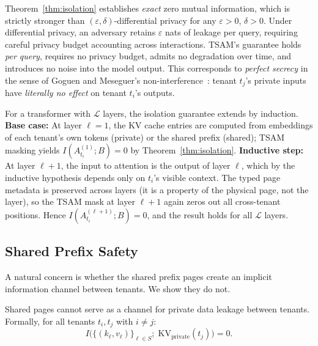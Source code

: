 \begin{remark}
\label{rem:dp-comparison}
Theorem~\ref{thm:isolation} establishes \emph{exact} zero mutual information, which is
strictly stronger than $(\varepsilon, \delta)$-differential privacy for any
$\varepsilon > 0$, $\delta > 0$. Under differential privacy, an adversary retains
$\varepsilon$ nats of leakage per query, requiring careful privacy budget accounting
across interactions. TSAM's guarantee holds \emph{per query}, requires no privacy budget,
admits no degradation over time, and introduces no noise into the model output. This
corresponds to \emph{perfect secrecy} in the sense of Goguen and Meseguer's
non-interference~\cite{goguen1982security}: tenant $t_j$'s private inputs have
\emph{literally no effect} on tenant $t_i$'s outputs.
\end{remark}

\begin{remark}
\label{rem:multilayer}
For a transformer with $\mathcal{L}$ layers, the isolation guarantee extends by induction.
\textbf{Base case:} At layer $\ell = 1$, the KV cache entries are computed from embeddings
of each tenant's own tokens (private) or the shared prefix (shared); TSAM masking yields
$I(A^{(1)}_{t_i}; B) = 0$ by Theorem~\ref{thm:isolation}. \textbf{Inductive step:}
At layer $\ell + 1$, the input to attention is the output of layer $\ell$, which by the
inductive hypothesis depends only on $t_i$'s visible context. The typed page metadata is
preserved across layers (it is a property of the physical page, not the layer), so the
TSAM mask at layer $\ell + 1$ again zeros out all cross-tenant positions. Hence
$I(A^{(\ell+1)}_{t_i}; B) = 0$, and the result holds for all $\mathcal{L}$ layers.
\end{remark}

\subsection{Shared Prefix Safety}
\label{sec:formal:shared}

A natural concern is whether the shared prefix pages create an implicit information channel
between tenants. We show they do not.

\begin{theorem}
\label{thm:shared-safety}
Shared pages cannot serve as a channel for private data leakage between tenants. Formally,
for all tenants $t_i, t_j$ with $i \neq j$:
\begin{equation}
    I\!\big(\{(k_\ell, v_\ell)\}_{\ell \in S};\; \mathrm{KV}_{\mathrm{private}}(t_j)\big) = 0.
\end{equation}
\end{theorem}

